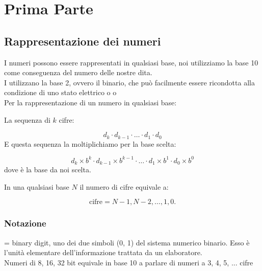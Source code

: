 \documentclass[arch.tex]{subfiles}
\begin{document}
\chapter{Prima Parte}

\section{Rappresentazione dei numeri}

I numeri possono essere rappresentati in qualsiasi base, noi utilizziamo la base
10 come conseguenza del numero delle nostre dita.\\
I  utilizzano la base 2, ovvero il binario, che può facilmente
essere ricondotta alla condizione di uno stato elettrico
o  o \\
Per la rappresentazione di un numero in qualsiasi base:
\begin{defn}
La sequenza di $k$ cifre:

\begin{equation}
	d_k \cdot d_{k-1} \cdot \dots \cdot d_1 \cdot d_0
\end{equation}
E questa sequenza la moltiplichiamo per la base scelta:

\begin{equation}
	d_k \times b^k \cdot d_{k-1} \times b^{k-1} \cdot 
	\dots \cdot d_1 \times b^1 \cdot d_0 \times b^0
\end{equation}
dove  è la base da noi scelta.
\end{defn}

\begin{defn}
In una qualsiasi base $N$ il numero di cifre equivale a:


\begin{equation}
	\mbox{cifre} = N - 1, N - 2, \dots, 1, 0.
\end{equation}
\end{defn}

\subsection{Notazione}
\begin{defn}[BIT]
 = binary digit, uno dei due simboli (0, 1) del sistema numerico binario.
Esso è l'unità elementare dell'informazione trattata da un elaboratore.\\
Numeri di 8, 16, 32 bit equivale in base 10 
a parlare di numeri a 3, 4, 5, ... cifre \\
\end{defn}
\end{document}
